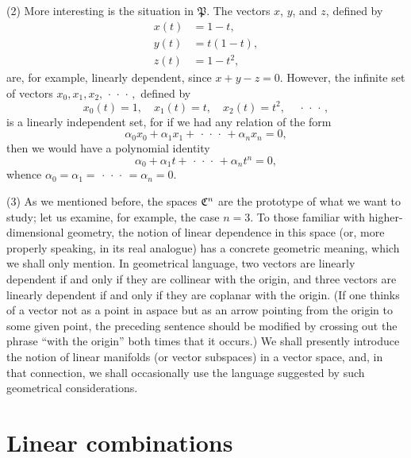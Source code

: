 (2) More interesting is the situation in \(\mathfrak{P}\). The vectors \(x\),
\(y\), and \(z\), defined by
\begin{align*}
    x(t) &= 1-t,\\
    y(t) &= t(1-t),\\
    z(t) &= 1-t^2,
\end{align*}
are, for example, linearly dependent, since \(x + y - z = 0\). However, the
infinite set of vectors \(x_0, x_1, x_2, \,\cdot\,\cdot\,\cdot\,,\) defined by
\begin{equation*}
    x_0(t) = 1, \quad x_1(t) = t, \quad x_2(t) = t^2, \quad \,\cdot\,\cdot\,\cdot\,,
\end{equation*}
is a linearly independent set, for if we had any relation of the form
\begin{equation*}
    \alpha_0 x_0 + \alpha_1 x_1 +  \,\cdot\,\cdot\,\cdot\, + \alpha_n x_n = 0,
\end{equation*}
then we would have a polynomial identity
\begin{equation*}
    \alpha_0 + \alpha_1 t +  \,\cdot\,\cdot\,\cdot\, + \alpha_n t^n = 0,
\end{equation*}
whence \(\alpha_0 = \alpha_1 = \,\cdot\,\cdot\,\cdot\, = \alpha_n = 0\).

(3) As we mentioned before, the spaces \(\mathfrak{C}^n\) are the prototype of what
we want to study; let us examine, for example, the case \(n = 3\). To those
familiar with higher-dimensional geometry, the notion of linear dependence in
this space (or, more properly speaking, in its real analogue) has a concrete
geometric meaning, which we shall only mention. In geometrical language, two
vectors are linearly dependent if and only if they are collinear with the
origin, and three vectors are linearly dependent if and only if they are
coplanar with the origin. (If one thinks of a vector not as a point in aspace
but as an arrow pointing from the origin to some given point, the preceding
sentence should be modified by crossing out the phrase ``with the origin'' both
times that it occurs.) We shall presently introduce the notion of linear
manifolds (or vector subspaces) in a vector space, and, in that connection, we
shall occasionally use the language suggested by such geometrical
considerations.

\section{Linear combinations}\label{sec-linear-combinations}

